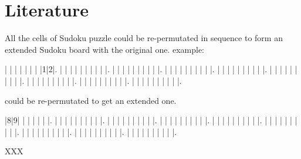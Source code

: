 \documentclass[11pt]{report}
\begin{document}
\section{Literature}
\label{sec:introLiterature}
All the cells of Sudoku puzzle could be re-permutated in sequence to form an extended Sudoku board with the original one.
example:
\begin{sudoku}
   | | | | | | | |1|2|.
   | | | | | | | | | |.
   | | | | | | | | | |.
   | | | | | | | | | |.
   | | | | | | | | | |.
   | | | | | | | | | |.
   | | | | | | | | | |.
   | | | | | | | | | |.
   | | | | | | | | | |.
\end{sudoku}
could be re-permutated to get an extended one.
\begin{sudoku}
\label{p48}
   |8|9| | | | | | |.
   | | | | | | | | | |.
   | | | | | | | | | |.
   | | | | | | | | | |.
   | | | | | | | | | |.
   | | | | | | | | | |.
   | | | | | | | | | |.
   | | | | | | | | | |.
   | | | | | | | | | |.
\end{sudoku}

\cite{Berthier2007Sudoku} XXX
\end{document}
